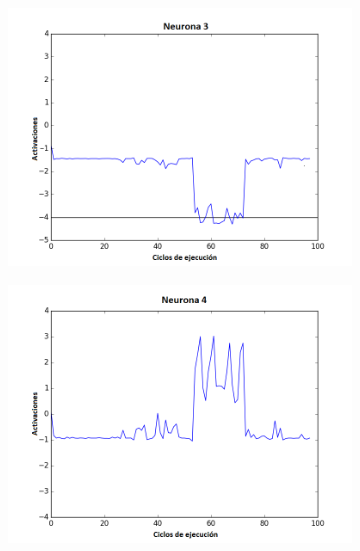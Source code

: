 \begin{figure}[!h]
\begin{subfigure}{0.33\textwidth}
  \includegraphics[width=\linewidth]{Imagenes/Agente1Activaciones/Agente2/Neurona2}
\end{subfigure}
\medskip
\begin{subfigure}{0.33\textwidth}
  \includegraphics[width=\linewidth]{Imagenes/Agente1Activaciones/Agente2/Neurona3}
\end{subfigure}\hfil %
\begin{subfigure}{0.33\textwidth}

\end{subfigure}
\end{figure}

